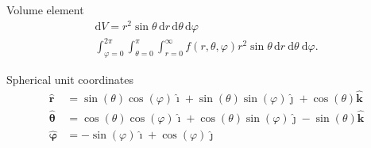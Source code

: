 \documentclass[12pt,a4paper]{article}
\begin{document}
\begin{multicols*}{2}
Volume element
\begin{align*}
\mathrm{d}V=r^2 \sin \theta \,\mathrm{d}r\,\mathrm{d}\theta\,\mathrm{d}\varphi \\
\int_{\varphi=0}^{2 \pi} \int_{\theta=0}^{\pi} \int_{r=0}^{\infty} f(r,\theta,\varphi) r^2 \sin \theta \,\mathrm{d}r\ \mathrm{d}\theta\ \mathrm{d}\varphi.
\end{align*}

Spherical unit coordinates
\begin{align*}
\boldsymbol{\hat r}&=\sin (\theta) \cos (\varphi) \boldsymbol{\hat{\imath}} +\sin (\theta) \sin (\varphi) \boldsymbol{\hat{\jmath}} +\cos (\theta) \boldsymbol{\hat{k}}
\\
 \boldsymbol{\hat\theta }&=\cos (\theta) \cos (\varphi) \boldsymbol{\hat{\imath}} +\cos (\theta) \sin (\varphi) \boldsymbol{\hat{\jmath}}-\sin (\theta) \boldsymbol{\hat{k}}
\\
\boldsymbol{\hat \varphi}&=-\sin (\varphi) \boldsymbol{\hat{\imath}} + \cos (\varphi) \boldsymbol{\hat{\jmath}}
\end{align*}


\end{multicols*}
\end{document}
